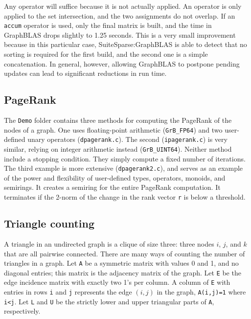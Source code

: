 \documentclass[12pt]{article}
\begin{document}
Any operator will suffice because it is not actually applied.  An operator is
only applied to the set intersection, and the two assignments do not overlap.
If an \verb'accum' operator is used, only the final matrix is built, and the
time in GraphBLAS drops slightly to 1.25 seconds.  This is a very small
improvement because in this particular case, SuiteSparse:GraphBLAS is able to
detect that no sorting is required for the first build, and the second one is a
simple concatenation.  In general, however, allowing GraphBLAS to postpone
pending updates can lead to significant reductions in run time.

\subsection{PageRank}
\label{pagerank}

The \verb'Demo' folder contains three methods for computing the PageRank of the
nodes of a graph.  One uses floating-point arithmetic (\verb'GrB_FP64') and two
user-defined unary operators (\verb'dpagerank.c').  The second
(\verb'ipagerank.c') is very similar, relying on integer arithmetic instead
(\verb'GrB_UINT64').  Neither method include a stopping condition.  They simply
compute a fixed number of iterations.  The third example is more extensive
(\verb'dpagerank2.c'), and serves as an example of the power and flexibility of
user-defined types, operators, monoids, and semirings.  It creates a semiring
for the entire PageRank computation.  It terminates if the 2-norm of the change
in the rank vector \verb'r' is below a threshold.

\newpage
\subsection{Triangle counting}
\label{triangle}

A triangle in an undirected graph is a clique of size three:  three nodes $i$,
$j$, and $k$ that are all pairwise connected.  There are many ways of counting
the number of triangles in a graph.  Let \verb'A' be a symmetric matrix with
values 0 and 1, and no diagonal entries; this matrix is the adjacency matrix of
the graph.  Let \verb'E' be the edge incidence matrix with exactly two 1's per
column.  A column of \verb'E' with entries in rows \verb'i' and \verb'j'
represents the edge $(i,j)$ in the graph, \verb'A(i,j)=1' where \verb'i<j'.
Let \verb'L' and \verb'U' be the strictly lower and upper triangular parts of
\verb'A', respectively.
\end{document}
